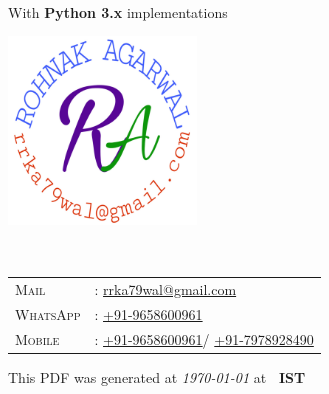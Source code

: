 \begin{titlepage}




\begin{center}

    
\vspace*{2.5cm}
{\Huge \bookname} \\[0.3cm]
{\Large With \textbf{Python 3.x} implementations}

\vfill

\includegraphics[width=5cm, height=5cm, keepaspectratio]{images/logo.jpg}

\vfill


\RaggedRight
\hspace{1.5cm}
{
\begin{minipage}{12cm}
{\fontsize{19}{19}\selectfont \authorname} \\[0.2cm]
\fontsize{15}{15}\selectfont 
\begin{tabular}{l l}
    \textsc{Mail}       & : \href{mailto:rrka79wal@gmail.com}{rrka79wal@gmail.com}  \\

    \textsc{WhatsApp}   & : \href{https://wa.me/+919658600961?text=Hello}{+91-9658600961}  \\

    \textsc{Mobile}     & : \href{tel:+919658600961}{+91-9658600961}/ 
                        \href{tel:+917978928490}{+91-7978928490} \\

\end{tabular}
\end{minipage}
}

\vspace{1cm}
\centering
{
    \fontsize{14}{14}\selectfont  
    This PDF was generated at \textit{\today} at \textbf{\currenttime\ IST}
}

\vspace{1cm}


\end{center}



\restoregeometry

\end{titlepage}
